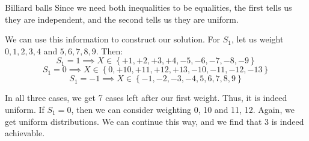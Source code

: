 \documentclass[a4paper]{article}
\begin{document}
\begin{parag}{Billiard balls}
    Since we need both inequalities to be equalities, the first tells us they are independent, and the second tells us they are uniform.

    We can use this information to construct our solution. For $S_1$, let us weight $0, 1, 2, 3, 4$ and $5, 6, 7, 8, 9$. Then:
    \[S_1 = 1 \implies X \in \left\{+1, +2, +3, +4, -5, -6, -7, -8, -9\right\}\]
    \[S_1 = 0 \implies X \in \left\{0, +10, +11, +12, +13, -10, -11, -12, -13\right\}\]
    \[S_1 = -1 \implies X \in \left\{-1, -2, -3, -4, 5, 6, 7, 8, 9\right\}\]

    In all three cases, we get 7 cases left after our first weight. Thus, it is indeed uniform. If $S_1 = 0$, then we can consider weighting 0, 10 and 11, 12. Again, we get uniform distributions. We can continue this way, and we find that 3 is indeed achievable.
\end{parag}
\end{document}
